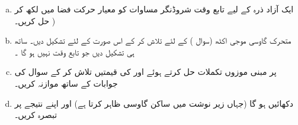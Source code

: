 \begin{enumerate}[a.]
\item 
 ایک آزاد ذرہ کے لیے تابع وقت شروڈنگر مساوات کو معیار حرکت فضا میں لکھ کر حل کریں۔  ) 
\item
 متحرک گاوسی موجی اکٹھ (سوال ) کے لئے  تلاش کر کے اس صورت کے لئے  تشکیل دیں۔ ساتھ ہی  تشکیل دیں جو تابع وقت نہیں ہو گا ۔ 
 \item
  پر مبنی موزوں تکملات حل کرتے ہوئے  اور  کی قیمتیں تلاش کر کے سوال  کی جوابات کے ساتھ موازنہ کریں۔ 
 \item
 دکھائیں  ہو گا (جہاں زیر نوشت میں ساکن گاوسی ظاہر کرتا ہے) اور اپنے نتیجے پر تبصرہ کریں۔
 \end{enumerate}


